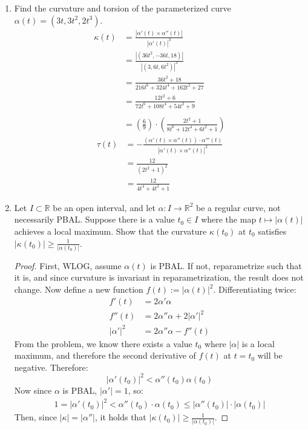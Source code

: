 \documentclass[a4paper,17pt]{extarticle}
\theoremstyle{definition}
\renewcommand{\leq}{\leqslant}
\renewcommand{\geq}{\geqslant}
\newcommand{\R}{\mathbb{R}}
\begin{document}
\begin{enumerate}
    \item Find the curvature and torsion of the parameterized curve $\alpha(t) = (3t,3t^2,2t^3)$. \begin{align*}
    \kappa(t)&=\frac{|\alpha'(t)\times\alpha''(t)|}{|\alpha'(t)|^3}\\
    &=\frac{|(36t^2,-36t,18)|}{|(3,6t,6t^2)|^3}\\
    &=\frac{36t^2+18}{216t^6+324t^4+162t^2+27}\\
    &=\frac{12t^2+6}{72t^6+108t^4+54t^2+9}\\\\
    &=\left(\frac{6}{9}\right)\cdot\left(\frac{2t^2+1}{8t^6+12t^4+6t^2+1}\right)
    \end{align*}
    \begin{align*}
        \tau(t)&=-\frac{(\alpha'(t)\times\alpha''(t))\cdot\alpha'''(t)}{|\alpha'(t)\times\alpha''(t)|^2}\\
        &=\frac{12}{(2t^2+1)^2}\\
        &=\frac{12}{4t^4+4t^2+1}
    \end{align*}
    \item Let $I\subset\R$ be an open interval, and let $\alpha:I\to\R^2$ be a regular curve, not necessarily PBAL. Suppose there is a value $t_0\in I$ where the map $t\mapsto|\alpha(t)|$ achieves a local maximum. Show that the curvature $\kappa(t_0)$ at $t_0$ satisfies $|\kappa(t_0)|\geq\frac{1}{|\alpha(t_0)|}$. \begin{proof} First, WLOG, assume $\alpha(t)$ is PBAL. If not, reparametrize such that it is, and since curvature is invariant in reparametrization, the result does not change. Now define a new function $f(t):=|\alpha(t)|^2$. Differentiating twice:\begin{align*}
        f'(t)&=2\alpha'\alpha\\
        f''(t)&=2\alpha''\alpha+2|\alpha'|^2\\
        |\alpha'|^2&=2\alpha''\alpha-f''(t)
    \end{align*}
    From the problem, we know there exists a value $t_0$ where $|\alpha|$ is a local maximum, and therefore the second derivative of $f(t)$ at $t=t_0$ will be negative. Therefore: $$|\alpha'(t_0)|^2<\alpha''(t_0)\alpha(t_0)$$
    Now since $\alpha$ is PBAL, $|\alpha'|=1$, so:\begin{align*}
        1=|\alpha'(t_0)|^2<\alpha''(t_0)\cdot\alpha(t_0)\leq|\alpha''(t_0)|\cdot|\alpha(t_0)|
    \end{align*}Then, since $|\kappa|=|\alpha''|$, it holds that $|\kappa(t_0)|\geq\frac{1}{|\alpha(t_0)|}$.

\end{proof}
\end{enumerate}
\end{document}
